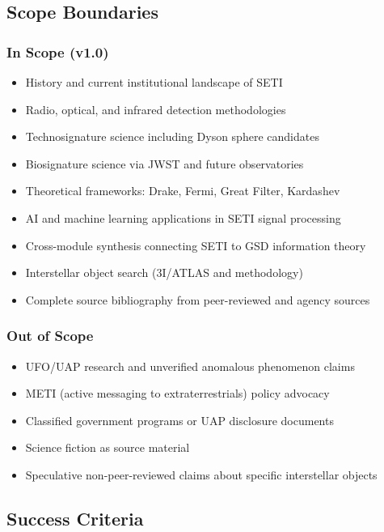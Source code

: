 \documentclass[11pt,letterpaper]{article}
\begin{document}
\subsection{Scope Boundaries}

\subsubsection{In Scope (v1.0)}
\begin{itemize}[leftmargin=1.5em]
  \item History and current institutional landscape of SETI
  \item Radio, optical, and infrared detection methodologies
  \item Technosignature science including Dyson sphere candidates
  \item Biosignature science via JWST and future observatories
  \item Theoretical frameworks: Drake, Fermi, Great Filter, Kardashev
  \item AI and machine learning applications in SETI signal processing
  \item Cross-module synthesis connecting SETI to GSD information theory
  \item Interstellar object search (3I/ATLAS and methodology)
  \item Complete source bibliography from peer-reviewed and agency sources
\end{itemize}

\subsubsection{Out of Scope}
\begin{itemize}[leftmargin=1.5em]
  \item UFO/UAP research and unverified anomalous phenomenon claims
  \item METI (active messaging to extraterrestrials) policy advocacy
  \item Classified government programs or UAP disclosure documents
  \item Science fiction as source material
  \item Speculative non-peer-reviewed claims about specific interstellar objects
\end{itemize}

\subsection{Success Criteria}
\end{document}
